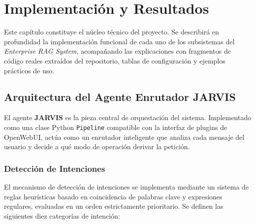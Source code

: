 \chapter{Implementación y Resultados}
\label{cap:resultados}

Este capítulo constituye el núcleo técnico del proyecto. Se describirá en profundidad la implementación funcional de cada uno de los subsistemas del \textit{Enterprise RAG System}, acompañando las explicaciones con fragmentos de código reales extraídos del repositorio, tablas de configuración y ejemplos prácticos de uso.

\section{Arquitectura del Agente Enrutador JARVIS}

El agente \textbf{JARVIS} es la pieza central de orquestación del sistema. Implementado como una clase Python \texttt{Pipeline} compatible con la interfaz de plugins de OpenWebUI, actúa como un enrutador inteligente que analiza cada mensaje del usuario y decide a qué modo de operación derivar la petición.

\subsection{Detección de Intenciones}
El mecanismo de detección de intenciones se implementa mediante un sistema de reglas heurísticas basado en coincidencia de palabras clave y expresiones regulares, evaluadas en un orden estrictamente prioritario. Se definen las siguientes diez categorías de intención:

